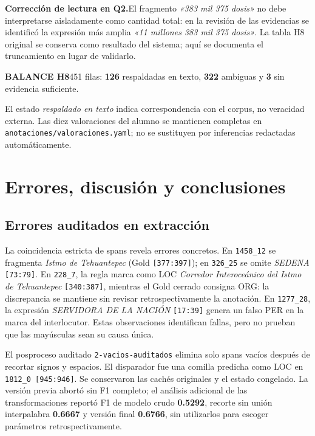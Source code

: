\documentclass[10pt,a4paper]{article}
\newcommand{\notebox}[2]{\begin{tcolorbox}[colback=palewarm,colframe=palewarm,boxrule=0pt,arc=1mm,left=8pt,right=8pt,top=6pt,bottom=6pt,borderline west={2pt}{0pt}{ochre}]\textbf{#1}\enspace #2\end{tcolorbox}}
\begin{document}
\notebox{Corrección de lectura en Q2.}{El fragmento \emph{«383 mil 375 dosis»} no debe interpretarse aisladamente como cantidad total: en la revisión de las evidencias se identificó la expresión más amplia \emph{«11 millones 383 mil 375 dosis»}. La tabla H8 original se conserva como resultado del sistema; aquí se documenta el truncamiento en lugar de validarlo.}

\vspace{2pt}
{\sffamily\fontsize{8.3}{10}\selectfont\color{teal}\textbf{BALANCE H8}\hspace{8pt}451 filas: \textbf{126} respaldadas en texto, \textbf{322} ambiguas y \textbf{3} sin evidencia suficiente.}\par
El estado \emph{respaldado en texto} indica correspondencia con el corpus, no veracidad externa. Las diez valoraciones del alumno se mantienen completas en \texttt{anotaciones/valoraciones.yaml}; no se sustituyen por inferencias redactadas automáticamente.


\section{Errores, discusión y conclusiones}
\subsection{Errores auditados en extracción}
La coincidencia estricta de spans revela errores concretos. En \texttt{1458\_12} se fragmenta \emph{Istmo de Tehuantepec} (Gold \texttt{[377:397]}); en \texttt{326\_25} se omite \emph{SEDENA} \texttt{[73:79]}. En \texttt{228\_7}, la regla marca como LOC \emph{Corredor Interoceánico del Istmo de Tehuantepec} \texttt{[340:387]}, mientras el Gold cerrado consigna ORG: la discrepancia se mantiene sin revisar retrospectivamente la anotación. En \texttt{1277\_28}, la expresión \emph{SERVIDORA DE LA NACIÓN} \texttt{[17:39]} genera un falso PER en la marca del interlocutor. Estas observaciones identifican fallas, pero no prueban que las mayúsculas sean su causa única.

El posproceso auditado \texttt{2-vacios-auditados} elimina solo spans vacíos después de recortar signos y espacios. El disparador fue una comilla predicha como LOC en \texttt{1812\_0 [945:946]}. Se conservaron las cachés originales y el estado congelado. La versión previa abortó sin F1 completo; el análisis adicional de las transformaciones reportó F1 de modelo crudo \textbf{0.5292}, recorte sin unión interpalabra \textbf{0.6667} y versión final \textbf{0.6766}, sin utilizarlos para escoger parámetros retrospectivamente.
\end{document}
